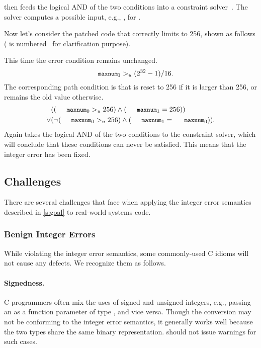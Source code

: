 \sys then feeds the logical AND of the two conditions into a
constraint solver~\cite{boolector}.  The solver computes a possible
input, e.g., , for .

Now let's consider the patched code that correctly limits 
to 256, shown as follows ( is
numbered~\cite[\chapterautorefname~8.11]{whale} for clarification
purpose).

This time the error condition remains unchanged.
\begin{equation*}
\cc{maxnum}_1 >_u (2^{32} - 1) / 16.
\end{equation*}
The corresponding path condition is that  is reset to 256
if it is larger than 256, or remains the old value otherwise.
\begin{align*}
& ((\cc{maxnum}_0 >_u 256) \land (\cc{maxnum}_1 = 256)) \\
\lor
& (\neg (\cc{maxnum}_0 >_u 256) \land (\cc{maxnum}_1 = \cc{maxnum}_0)).
\end{align*}
Again \sys takes the logical AND of the two conditions to the
constraint solver, which will conclude that these conditions can
never be satisfied.  This means that the integer error has been
fixed.

\subsection{Challenges}
\label{s:chal}

There are several challenges that face \sys when applying the
integer error semantics described in \autoref{s:goal} to real-world
systems code.

\subsubsection{Benign Integer Errors}

While violating the integer error semantics, some commonly-used C
idioms will not cause any defects.  We recognize them as follows.

\paragraph{Signedness.}
C programmers often mix the uses of signed and unsigned integers,
e.g., passing an  as a function parameter of type , and vice versa.  Though the conversion may not be conforming
to the integer error semantics, it generally works well because the
two types share the same binary representation.  \sys should not
issue warnings for such cases.

